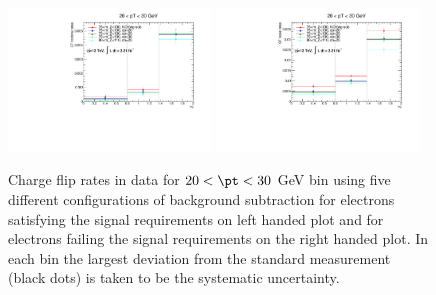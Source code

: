 \begin{figure}[htb!]
\centering
\includegraphics[width=0.48\textwidth]{FIGURES/BKG/chargeFlip/CFrates___SYStypes___PTbin1.pdf}
\includegraphics[width=0.48\textwidth]{FIGURES/BKG/chargeFlip/CFratesLOOSE___SYStypes___PTbin1.pdf}
\caption{\label{fig:CFsys} Charge flip rates in data for $20<\pt<30$ GeV bin using five different configurations of background subtraction for electrons satisfying the signal requirements on left handed plot and for electrons failing the signal requirements on the right handed plot. In each bin the largest deviation from the standard measurement (black dots) is taken to be the systematic uncertainty.}
\end{figure}


